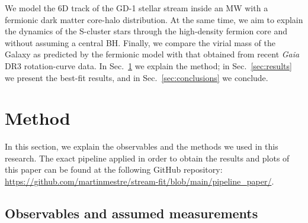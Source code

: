 \documentclass[referee]{aa} %
\begin{document}
We model the 6D track of the GD-1 stellar stream inside an MW with a fermionic dark matter core-halo distribution. At the same time, we aim to explain the dynamics of the S-cluster stars through the high-density fermion core and without assuming a central BH. Finally, we compare the virial mass of the Galaxy as predicted by the fermionic model with that obtained from recent \textit{Gaia} DR3 rotation-curve data. In Sec.~\ref{sec:methodology} we explain the method; in Sec.~\ref{sec:results} we present the best-fit results, and in Sec.~\ref{sec:conclusions} we conclude.

\section{Method}
\label{sec:methodology}
In this section, we explain the observables and the methods we used in this research.
The exact pipeline applied in order to obtain the results and plots of this paper
can be found at the following GitHub repository:
\url{https://github.com/martinmestre/stream-fit/blob/main/pipeline_paper/}.

\subsection{Observables and assumed measurements}
\label{sec:observables}
\end{document}
